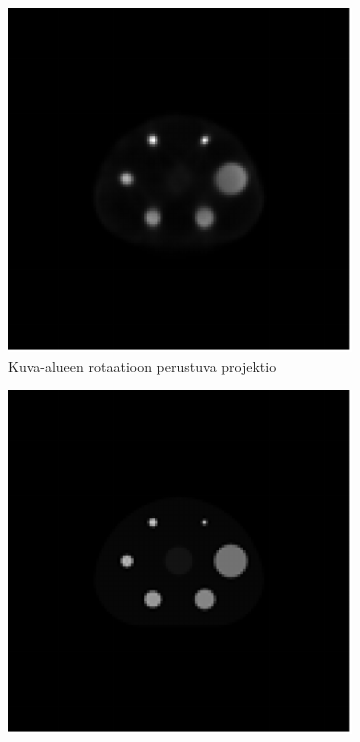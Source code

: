 \begin{figure}[H]
    \centering
    \captionsetup{width=.9\linewidth}
    \begin{subfigure}[t]{.25\textwidth}
        \includegraphics[width=\linewidth]{kuvat/rekonstruktio_proj6.pdf}
        \caption{Kuva-alueen rotaatioon perustuva projektio}
    \end{subfigure}%
    \hspace{.075\textwidth}%
    \begin{subfigure}[t]{.25\textwidth}
        \includegraphics[width=\linewidth]{kuvat/ground_truth.pdf}

\end{subfigure}
\end{figure}
